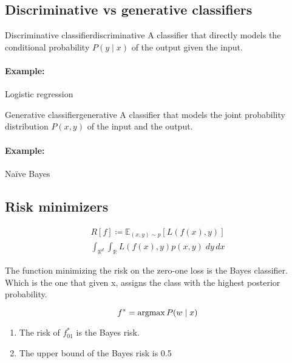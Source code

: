 \subsection{Discriminative vs generative classifiers}

\begin{definition}{Discriminative classifier}{discriminative}
	A classifier that directly models the conditional probability
	\(P(y \mid x)\) of the output given the input.
  \tcblower
	\paragraph{Example:} Logistic regression
\end{definition}

\begin{definition}{Generative classifier}{generative}
	A classifier that models the joint probability distribution
	\(P(x, y)\) of the input and the output.
  \tcblower
	\paragraph{Example:} Naïve Bayes
\end{definition}

\subsection{Risk minimizers}

\begin{align*}
	R[f] \coloneqq \mathds{E}_{(x, y) \sim p} [ L(f(x), y) ] \\
	\int_{\mathds{R}^d} \int_{\mathds{R}} L(f(x), y) p(x, y)\; dy\, dx
\end{align*}

\begin{prop}{}{}

	The function minimizing the risk on the zero-one loss is the Bayes
	classifier. Which is the one that given x, assigns the class with the
	highest posterior probability.

	\[f^* = \operatorname{argmax} {P(w \mid x)}\]

	\begin{enumerate}
		\item The risk of \(f_{01}^*\) is the Bayes risk.
		\item The upper bound of the Bayes risk is 0.5
	\end{enumerate}

\end{prop}

